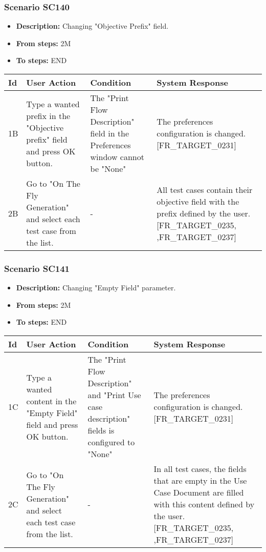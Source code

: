 \documentclass[a4paper,11pt]{article}
\newcommand{\bl}{\\ \hline}
\begin{document}
\subsubsection*{Scenario SC140}
\begin{itemize}
\item {\bf Description:} Changing "Objective Prefix" field.
\item {\bf From steps:} 2M
\item {\bf To steps:} END
\end{itemize}
\begin{tabular}{|p{0.4in}|p{1.5in}|p{1.5in}|p{1.5in}|}
\hline
Id & User Action & Condition & System Response \bl 
1B & Type a wanted prefix in the "Objective prefix" field and
						press OK button. & The "Print Flow Description" field in the Preferences
						window cannot be "None" & The preferences configuration is changed.
						[FR_TARGET_0231]\bl
2B & Go to "On The Fly Generation" and select each test case
						from the list. & - & All test cases contain their objective field with the
						prefix defined by the user. [FR_TARGET_0235, ,FR_TARGET_0237]
					\bl
\end{tabular}
\subsubsection*{Scenario SC141}
\begin{itemize}
\item {\bf Description:} Changing "Empty Field" parameter.
\item {\bf From steps:} 2M
\item {\bf To steps:} END
\end{itemize}
\begin{tabular}{|p{0.4in}|p{1.5in}|p{1.5in}|p{1.5in}|}
\hline
Id & User Action & Condition & System Response \bl 
1C & Type a wanted content in the "Empty Field" field and press
						OK button. & The "Print Flow Description" and "Print Use case
						description" fields is configured to "None" & The preferences configuration is changed.
						[FR_TARGET_0231]\bl
2C & Go to "On The Fly Generation" and select each test case
						from the list. & - & In all test cases, the fields that are empty in the Use
						Case Document are filled with this content defined by the user.
						[FR_TARGET_0235, ,FR_TARGET_0237]\bl
\end{tabular}
\end{document}

